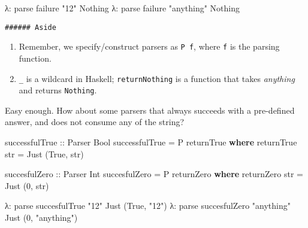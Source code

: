 \documentclass[]{article}
\newenvironment{Shaded}{}{}
\newcommand{\KeywordTok}[1]{\textcolor[rgb]{0.00,0.44,0.13}{\textbf{{#1}}}}
\newcommand{\DataTypeTok}[1]{\textcolor[rgb]{0.56,0.13,0.00}{{#1}}}
\newcommand{\DecValTok}[1]{\textcolor[rgb]{0.25,0.63,0.44}{{#1}}}
\newcommand{\StringTok}[1]{\textcolor[rgb]{0.25,0.44,0.63}{{#1}}}
\newcommand{\OtherTok}[1]{\textcolor[rgb]{0.00,0.44,0.13}{{#1}}}
\newcommand{\FunctionTok}[1]{\textcolor[rgb]{0.02,0.16,0.49}{{#1}}}
\newcommand{\NormalTok}[1]{{#1}}
\begin{document}
\begin{Shaded}
\begin{Highlighting}[]
\NormalTok{λ}\FunctionTok{:} \NormalTok{parse failure }\StringTok{"12"}
\DataTypeTok{Nothing}
\NormalTok{λ}\FunctionTok{:} \NormalTok{parse failure }\StringTok{"anything"}
\DataTypeTok{Nothing}
\end{Highlighting}
\end{Shaded}

\begin{verbatim}
###### Aside
\end{verbatim}

\begin{enumerate}
\def\labelenumi{\arabic{enumi}.}
\tightlist
\item
  Remember, we specify/construct parsers as \texttt{P\ f}, where
  \texttt{f} is the parsing function.
\item
  \texttt{\_} is a wildcard in Haskell; \texttt{returnNothing} is a
  function that takes \emph{anything} and returns \texttt{Nothing}.
\end{enumerate}

Easy enough. How about some parsers that always succeeds with a
pre-defined answer, and does not consume any of the string?

\begin{Shaded}
\begin{Highlighting}[]
\OtherTok{successfulTrue ::} \DataTypeTok{Parser} \DataTypeTok{Bool}
\NormalTok{successfulTrue }\FunctionTok{=} \DataTypeTok{P} \NormalTok{returnTrue}
    \KeywordTok{where}
        \NormalTok{returnTrue str }\FunctionTok{=} \DataTypeTok{Just} \NormalTok{(}\DataTypeTok{True}\NormalTok{, str)}

\OtherTok{succesfulZero ::} \DataTypeTok{Parser} \DataTypeTok{Int}
\NormalTok{succesfulZero }\FunctionTok{=} \DataTypeTok{P} \NormalTok{returnZero}
    \KeywordTok{where}
        \NormalTok{returnZero str }\FunctionTok{=} \DataTypeTok{Just} \NormalTok{(}\DecValTok{0}\NormalTok{, str)}
\end{Highlighting}
\end{Shaded}

\begin{Shaded}
\begin{Highlighting}[]
\NormalTok{λ}\FunctionTok{:} \NormalTok{parse succesfulTrue }\StringTok{"12"}
\DataTypeTok{Just} \NormalTok{(}\DataTypeTok{True}\NormalTok{, }\StringTok{"12"}\NormalTok{)}
\NormalTok{λ}\FunctionTok{:} \NormalTok{parse succesfulZero }\StringTok{"anything"}
\DataTypeTok{Just} \NormalTok{(}\DecValTok{0}\NormalTok{, }\StringTok{"anything"}\NormalTok{)}
\end{Highlighting}
\end{Shaded}
\end{document}
